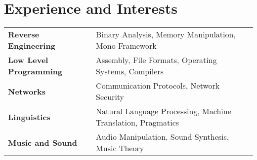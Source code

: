 \documentclass[12pt, a4paper, draft]{article}
\begin{document}
  \vspace{-10pt}\section*{Experience and Interests}
  \begin{tabularx}{\textwidth}{ l X }
    \textbf{Reverse Engineering} & Binary Analysis, Memory Manipulation, Mono Framework \\
    \textbf{Low Level Programming} & Assembly, File Formats, Operating Systems, Compilers \\
    \textbf{Networks} & Communication Protocols, Network Security \\
    \textbf{Linguistics} & Natural Language Processing, Machine Translation, Pragmatics \\
		\textbf{Music and Sound} & Audio Manipulation, Sound Synthesis, Music Theory \\
  \end{tabularx}
\end{document}
